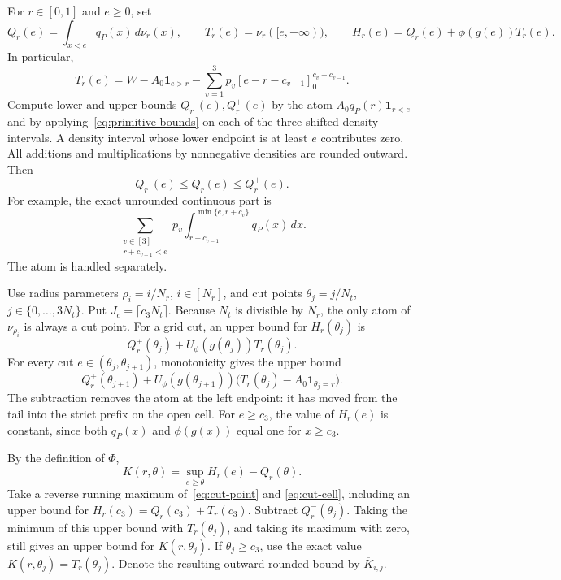 \documentclass[11pt]{article}
\numberwithin{equation}{section}
\theoremstyle{definition}
\newcommand{\ind}{\mathbf 1}
\begin{document}
For $r\in[0,1]$ and $e\ge0$, set
\[
 Q_r(e)=\int_{x<e}q_P(x)\,d\nu_r(x),\qquad
 T_r(e)=\nu_r([e,+\infty)),\qquad
 H_r(e)=Q_r(e)+\phi(g(e))T_r(e).
\]
In particular,
\begin{equation}\label{eq:exact-tail}
 T_r(e)=W-A_0\ind_{e>r}
       -\sum_{v=1}^3p_v[e-r-c_{v-1}]_0^{c_v-c_{v-1}}.
\end{equation}
Compute lower and upper bounds $Q_r^-(e),Q_r^+(e)$ by the atom
$A_0q_P(r)\ind_{r<e}$ and by applying~\eqref{eq:primitive-bounds}
on each of the three shifted density intervals. A density interval
whose lower endpoint is at least $e$ contributes zero.
All additions and multiplications by nonnegative densities are
rounded outward. Then
\begin{equation}\label{eq:Q-enclosure}
 Q_r^-(e)\le Q_r(e)\le Q_r^+(e).
\end{equation}
For example, the exact unrounded continuous part is
\[
 \sum_{\substack{v\in[3]\\r+c_{v-1}<e}}
       p_v\int_{r+c_{v-1}}^{\min\{e,r+c_v\}}q_P(x)\,dx.
\]
The atom is handled separately.

Use radius parameters $\rho_i=i/N_r$, $i\in[N_r]$, and cut points
$\theta_j=j/N_t$, $j\in\{0,\ldots,3N_t\}$.
Put $J_c=\lceil c_3N_t\rceil$.
Because $N_t$ is divisible by $N_r$, the only atom of
$\nu_{\rho_i}$ is always a cut point.
For a grid cut, an upper bound for $H_r(\theta_j)$ is
\begin{equation}\label{eq:cut-point}
 Q_r^+(\theta_j)+U_\phi(g(\theta_j))T_r(\theta_j).
\end{equation}
For every cut $e\in(\theta_j,\theta_{j+1})$, monotonicity gives the
upper bound
\begin{equation}\label{eq:cut-cell}
 Q_r^+(\theta_{j+1})
 +U_\phi(g(\theta_{j+1}))
          \bigl(T_r(\theta_j)-A_0\ind_{\theta_j=r}\bigr).
\end{equation}
The subtraction removes the atom at the left endpoint: it has moved
from the tail into the strict prefix on the open cell.
For $e\ge c_3$, the value of $H_r(e)$ is constant, since both
$q_P(x)$ and $\phi(g(x))$ equal one for $x\ge c_3$.

By the definition of $\Phi$,
\[
 K(r,\theta)=\sup_{e\ge\theta}H_r(e)-Q_r(\theta).
\]
Take a reverse running maximum of~\eqref{eq:cut-point} and
\eqref{eq:cut-cell}, including an upper bound for
$H_r(c_3)=Q_r(c_3)+T_r(c_3)$. Subtract $Q_r^-(\theta_j)$.
Taking the minimum of this upper bound with $T_r(\theta_j)$,
and taking its maximum with zero, still gives an upper bound for
$K(r,\theta_j)$. If $\theta_j\ge c_3$, use the exact value
$K(r,\theta_j)=T_r(\theta_j)$.
Denote the resulting outward-rounded bound by $\overline K_{i,j}$.
\end{document}
